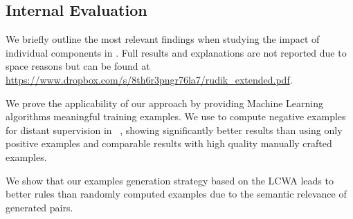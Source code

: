 \vspace{-1ex}
\subsection{Internal Evaluation} \label{sec:krd_int_evaluation}
\vspace{-0.2ex}
We briefly outline the most relevant findings when studying the impact of individual components in \krd.
Full results and explanations
are not reported due to space reasons but 
can be found  at \url{https://www.dropbox.com/s/8th6r3pngr76la7/rudik_extended.pdf}.

\noindent {} We prove the applicability of our approach by providing Machine Learning algorithms meaningful training examples.
We use \krd to compute negative examples for distant supervision in \deepdive~\cite{shin2015incremental}, showing significantly better results than using only positive examples 
and comparable results with high quality manually crafted examples.

\noindent {} We show that our examples generation strategy based on the LCWA leads to better rules than randomly computed examples due to the semantic relevance of generated pairs. 

